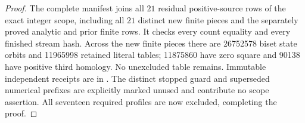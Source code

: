\begin{proof}
The complete manifest
joins all $21$ residual positive-source rows of the exact
integer scope, including all $21$ distinct new finite
pieces and the separately proved analytic and prior finite
rows. It checks every count equality and every finished
stream hash. Across the new finite pieces there are
26752578 biset state orbits and
11965998 retained literal tables;
11875860 have zero square and
90138 have positive third homology.
No unexcluded table remains. Immutable independent
receipts are in .
The distinct stopped guard and superseded numerical
prefixes are explicitly marked unused and contribute no
scope assertion. All seventeen required profiles are now
excluded, completing the proof.
\end{proof}
